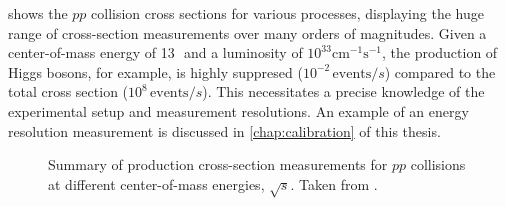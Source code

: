 
 shows the $pp$ collision cross sections for various processes, displaying the huge range of cross-section measurements over many orders of magnitudes. 
Given a center-of-mass energy of 13\,\TeV\ and a luminosity of $10^{33}\mathrm{cm^{-1}s^{-1}}$, the production of Higgs bosons, for example, is highly suppresed ($10^{-2}\,\text{events}/s$) compared to the total cross section ($10^8\,\text{events}/s$).
This necessitates a precise knowledge of the experimental setup and measurement resolutions. An example of an energy resolution measurement is discussed in \cref{chap:calibration} of this thesis. 


\begin{figure}
  \caption[Summary of production cross-sections measurements for $pp$ collisions at different center-of-mass energy, $\sqrt{s}$.]{
    Summary of production cross-section measurements for $pp$ collisions at different center-of-mass energies, $\sqrt{s}$. Taken from .
    }
  \label{fig:xsec}
\end{figure}


